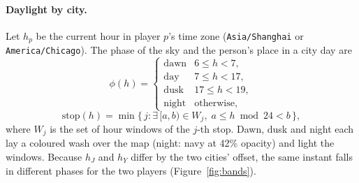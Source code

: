 \documentclass[sigconf,nonacm]{acmart}
\newcommand{\code}[1]{\textnormal{\texttt{\small #1}}}
\begin{document}
\paragraph{Daylight by city.} Let $h_p$ be the current hour in player $p$'s time zone
(\code{Asia/Shanghai} or \code{America/Chicago}). The phase of the sky and the person's place in a
city day are
\begin{equation}\label{eq:phase}
  \phi(h) = \begin{cases} \text{dawn} & 6 \le h < 7, \\ \text{day} & 7 \le h < 17, \\ \text{dusk} & 17 \le h < 19, \\ \text{night} & \text{otherwise,} \end{cases}
\end{equation}
\begin{equation}\label{eq:stop}
  \mathrm{stop}(h) = \min\big\{\, j : \exists\,[a,b) \in W_j,\; a \le h \bmod 24 < b \,\big\},
\end{equation}
where $W_j$ is the set of hour windows of the $j$-th stop. Dawn, dusk and night each lay a coloured
wash over the map (night: navy at 42\% opacity) and light the windows. Because $h_J$ and $h_Y$
differ by the two cities' offset, the same instant falls in different phases for the two players
(Figure~\ref{fig:bands}).
\end{document}

